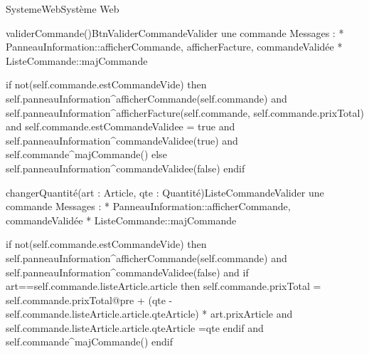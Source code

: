 \begin{OM}{SystemeWeb}{Système Web}
\begin{OMOperation}{validerCommande()}{BtnValiderCommande}{Valider une commande}
Messages :
* PanneauInformation::{afficherCommande, afficherFacture, commandeValidée}
* ListeCommande::{majCommande}
\begin{OMPre}
\end{OMPre}
\begin{OMPost}
        if not(self.commande.estCommandeVide) then
                self.panneauInformation^afficherCommande(self.commande)
                and
                self.panneauInformation^afficherFacture(self.commande, self.commande.prixTotal)
                and
                self.commande.estCommandeValidee = true
                and
                self.panneauInformation^commandeValidee(true)
                and
                self.commande^majCommande()
        else
                self.panneauInformation^commandeValidee(false)
        endif
            \end{OMPost}
\end{OMOperation}

\begin{OMOperation}{changerQuantité(art : Article, qte : Quantité)}{ListeCommande}{Valider une commande}
Messages :
* PanneauInformation::{afficherCommande, commandeValidée}
* ListeCommande::{majCommande}
\begin{OMPre}
\end{OMPre}
\begin{OMPost}
        if not(self.commande.estCommandeVide) then
                self.panneauInformation^afficherCommande(self.commande)
                and
                self.panneauInformation^commandeValidee(false)
                and
                if art==self.commande.listeArticle.article then
                        self.commande.prixTotal = self.commande.prixTotal@pre + (qte -
                                self.commande.listeArticle.article.qteArticle) * art.prixArticle
                        and
                        self.commande.listeArticle.article.qteArticle =qte
                endif
                and
                self.commande^majCommande()
        endif
            \end{OMPost}
\end{OMOperation}


\end{OM}
